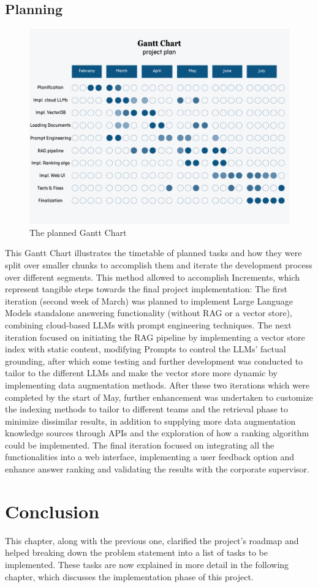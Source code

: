 \subsection{Planning}
\begin{figure}[htbp]
    \centering
    \includegraphics[width=\linewidth]{./figures/gantt-chart-1.png}
    \caption{The planned Gantt Chart}
\end{figure}
\par This Gantt Chart illustrates the timetable of planned tasks and how they were split over smaller chunks to accomplish them and iterate the development process over different segments. This method allowed to accomplish Increments, which represent tangible steps towards the final project implementation: The first iteration (second week of March) was planned to implement Large Language Models standalone answering functionality (without RAG or a vector store), combining cloud-based LLMs with prompt engineering techniques. The next iteration focused on initiating the RAG pipeline by implementing a vector store index with static content, modifying Prompts to control the LLMs' factual grounding, after which some testing and further development was conducted to tailor to the different LLMs and make the vector store more dynamic by implementing data augmentation methods. After these two iterations which were completed by the start of May, further enhancement was undertaken to customize the indexing methods to tailor to different teams and the retrieval phase to minimize dissimilar results, in addition to supplying more data augmentation knowledge sources through APIs and the exploration of how a ranking algorithm could be implemented. The final iteration focused on integrating all the functionalities into a web interface, implementing a user feedback option and enhance answer ranking and validating the results with the corporate supervisor.

\section{Conclusion}
This chapter, along with the previous one, clarified the project's roadmap and helped breaking down the problem statement into a list of tasks to be implemented. These tasks are now explained in more detail in the following chapter, which discusses the implementation phase of this project.